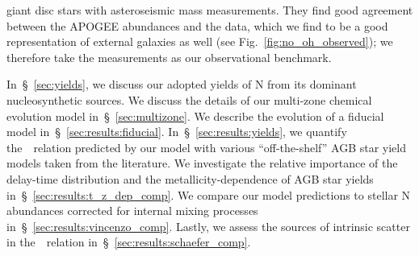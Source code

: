 \documentclass[ms.tex]{subfiles}
\begin{document}
giant disc stars with asteroseismic mass measurements.
They find good agreement between the APOGEE abundances and the
\citet{Dopita2016} data, which we find to be a good representation of external
galaxies as well (see Fig.~\ref{fig:no_oh_observed}); we therefore take the
\citet{Dopita2016} measurements as our observational benchmark.
\par
In~\S~\ref{sec:yields}, we discuss our adopted yields of N from its dominant
nucleosynthetic sources.
We discuss the details of our multi-zone chemical evolution model
in~\S~\ref{sec:multizone}.
We describe the evolution of a fiducial model in~\S~\ref{sec:results:fiducial}.
In~\S~\ref{sec:results:yields}, we quantify the~\ohno~relation predicted by our
model with various ``off-the-shelf'' AGB star yield models taken from the
literature.
We investigate the relative importance of the delay-time distribution and the
metallicity-dependence of AGB star yields in~\S~\ref{sec:results:t_z_dep_comp}.
We compare our model predictions to stellar N abundances corrected for internal
mixing processes in~\S~\ref{sec:results:vincenzo_comp}.
Lastly, we assess the sources of intrinsic scatter in the~\ohno~relation
in~\S~\ref{sec:results:schaefer_comp}.
\end{document}
